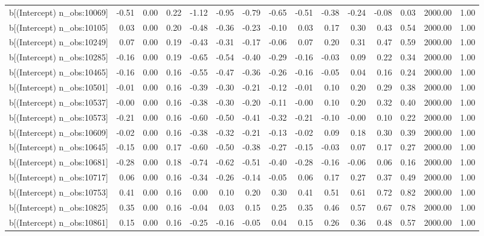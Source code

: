 \begin{table}[ht]
\begin{tabular}{rrrrrrrrrrrrrrr}
  b[(Intercept) n\_obs:10069] & -0.51 & 0.00 & 0.22 & -1.12 & -0.95 & -0.79 & -0.65 & -0.51 & -0.38 & -0.24 & -0.08 & 0.03 & 2000.00 & 1.00 \\ 
  b[(Intercept) n\_obs:10105] & 0.03 & 0.00 & 0.20 & -0.48 & -0.36 & -0.23 & -0.10 & 0.03 & 0.17 & 0.30 & 0.43 & 0.54 & 2000.00 & 1.00 \\ 
  b[(Intercept) n\_obs:10249] & 0.07 & 0.00 & 0.19 & -0.43 & -0.31 & -0.17 & -0.06 & 0.07 & 0.20 & 0.31 & 0.47 & 0.59 & 2000.00 & 1.00 \\ 
  b[(Intercept) n\_obs:10285] & -0.16 & 0.00 & 0.19 & -0.65 & -0.54 & -0.40 & -0.29 & -0.16 & -0.03 & 0.09 & 0.22 & 0.34 & 2000.00 & 1.00 \\ 
  b[(Intercept) n\_obs:10465] & -0.16 & 0.00 & 0.16 & -0.55 & -0.47 & -0.36 & -0.26 & -0.16 & -0.05 & 0.04 & 0.16 & 0.24 & 2000.00 & 1.00 \\ 
  b[(Intercept) n\_obs:10501] & -0.01 & 0.00 & 0.16 & -0.39 & -0.30 & -0.21 & -0.12 & -0.01 & 0.10 & 0.20 & 0.29 & 0.38 & 2000.00 & 1.00 \\ 
  b[(Intercept) n\_obs:10537] & -0.00 & 0.00 & 0.16 & -0.38 & -0.30 & -0.20 & -0.11 & -0.00 & 0.10 & 0.20 & 0.32 & 0.40 & 2000.00 & 1.00 \\ 
  b[(Intercept) n\_obs:10573] & -0.21 & 0.00 & 0.16 & -0.60 & -0.50 & -0.41 & -0.32 & -0.21 & -0.10 & -0.00 & 0.10 & 0.22 & 2000.00 & 1.00 \\ 
  b[(Intercept) n\_obs:10609] & -0.02 & 0.00 & 0.16 & -0.38 & -0.32 & -0.21 & -0.13 & -0.02 & 0.09 & 0.18 & 0.30 & 0.39 & 2000.00 & 1.00 \\ 
  b[(Intercept) n\_obs:10645] & -0.15 & 0.00 & 0.17 & -0.60 & -0.50 & -0.38 & -0.27 & -0.15 & -0.03 & 0.07 & 0.17 & 0.27 & 2000.00 & 1.00 \\ 
  b[(Intercept) n\_obs:10681] & -0.28 & 0.00 & 0.18 & -0.74 & -0.62 & -0.51 & -0.40 & -0.28 & -0.16 & -0.06 & 0.06 & 0.16 & 2000.00 & 1.00 \\ 
  b[(Intercept) n\_obs:10717] & 0.06 & 0.00 & 0.16 & -0.34 & -0.26 & -0.14 & -0.05 & 0.06 & 0.17 & 0.27 & 0.37 & 0.49 & 2000.00 & 1.00 \\ 
  b[(Intercept) n\_obs:10753] & 0.41 & 0.00 & 0.16 & 0.00 & 0.10 & 0.20 & 0.30 & 0.41 & 0.51 & 0.61 & 0.72 & 0.82 & 2000.00 & 1.00 \\ 
  b[(Intercept) n\_obs:10825] & 0.35 & 0.00 & 0.16 & -0.04 & 0.03 & 0.15 & 0.25 & 0.35 & 0.46 & 0.57 & 0.67 & 0.78 & 2000.00 & 1.00 \\ 
  b[(Intercept) n\_obs:10861] & 0.15 & 0.00 & 0.16 & -0.25 & -0.16 & -0.05 & 0.04 & 0.15 & 0.26 & 0.36 & 0.48 & 0.57 & 2000.00 & 1.00 \\ 

\end{tabular}
\end{table}
